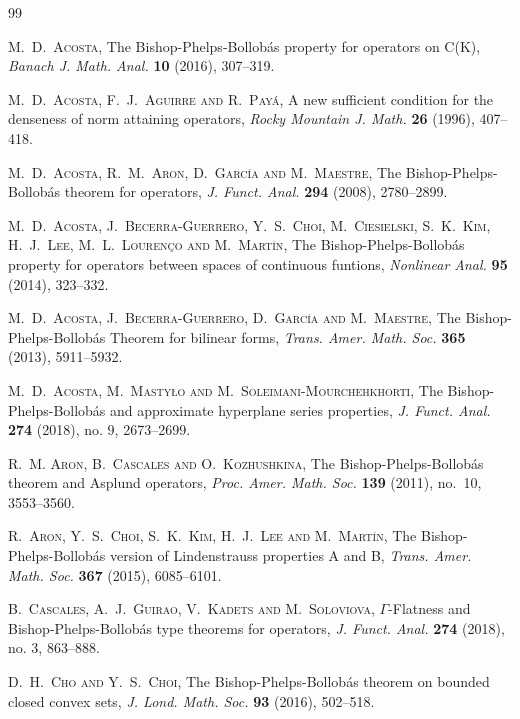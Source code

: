 \documentclass[a4paper,10pt]{amsart}
\theoremstyle{plain}
\theoremstyle{definition}
\begin{document}
\begin{thebibliography}{99}


 \textsc{M.~D.~Acosta}, The Bishop-Phelps-Bollob\'{a}s property for operators on C(K), \emph{Banach J. Math. Anal.} \textbf{10} (2016), 307--319.

 \textsc{M.~D.~Acosta, F.~J.~Aguirre and R.~Pay\'a}, A new sufficient condition for the denseness of norm attaining operators, \emph{Rocky Mountain J. Math.} \textbf{26} (1996), 407--418.


 \textsc{M.~D.~Acosta, R.~M.~Aron, D.~Garc\'ia and M.~Maestre}, The Bishop-Phelps-Bollob\'as theorem for operators, \emph{J. Funct. Anal.} {\bf 294} (2008), 2780--2899.

 \textsc{M.~D.~Acosta, J.~Becerra-Guerrero, Y.~S.~Choi, M.~Ciesielski, S.~K.~Kim, H.~J.~Lee, M.~L.~Louren\c{c}o and M.~Mart\'in}, The Bishop-Phelps-Bollob\'as property for operators between spaces of continuous funtions, \emph{Nonlinear Anal.} {\bf 95} (2014), 323--332.

\textsc{M.~D.~Acosta, J.~Becerra-Guerrero, D.~Garc\'{\i}a and M.~Maestre}, The Bishop-Phelps-Bollob\'as Theorem for bilinear forms, \emph{Trans. Amer. Math. Soc.} {\bf 365} (2013), 5911--5932.

 \textsc{M.~D.~Acosta, M.~Masty{\l}o and M.~Soleimani-Mourchehkhorti}, The Bishop-Phelps-Bollob\'as and approximate hyperplane series properties, \emph{J. Funct. Anal.} \textbf{274} (2018), no. 9, 2673--2699.

\textsc{R.~M. Aron, B.~Cascales and O.~Kozhushkina}, The {B}ishop-{P}helps-{B}ollob\'as theorem and {A}splund operators, \emph{Proc. Amer.  Math. Soc.} \textbf{139} (2011), no.~10, 3553--3560.

  \textsc{R.~Aron, Y.~S.~Choi, S.~K.~Kim, H.~J.~Lee and M.~Mart\'in}, The Bishop-Phelps-Bollob\'{a}s version of Lindenstrauss properties A and B,  \emph{Trans. Amer. Math. Soc.} \textbf{367} (2015), 6085--6101.

  \textsc{B.~Cascales, A.~J.~Guirao, V.~Kadets and M.~Soloviova}, $\Gamma$-Flatness and Bishop-Phelps-Bollob\'as type theorems for operators, \emph{J. Funct. Anal.} \textbf{274} (2018), no. 3, 863--888.

 \textsc{D.~H.~Cho and Y.~S.~Choi}, The Bishop-Phelps-Bollob\'{a}s theorem on bounded closed convex sets, \emph{J. Lond. Math. Soc.} \textbf{93} (2016),  502--518.


\end{thebibliography}
\end{document}
